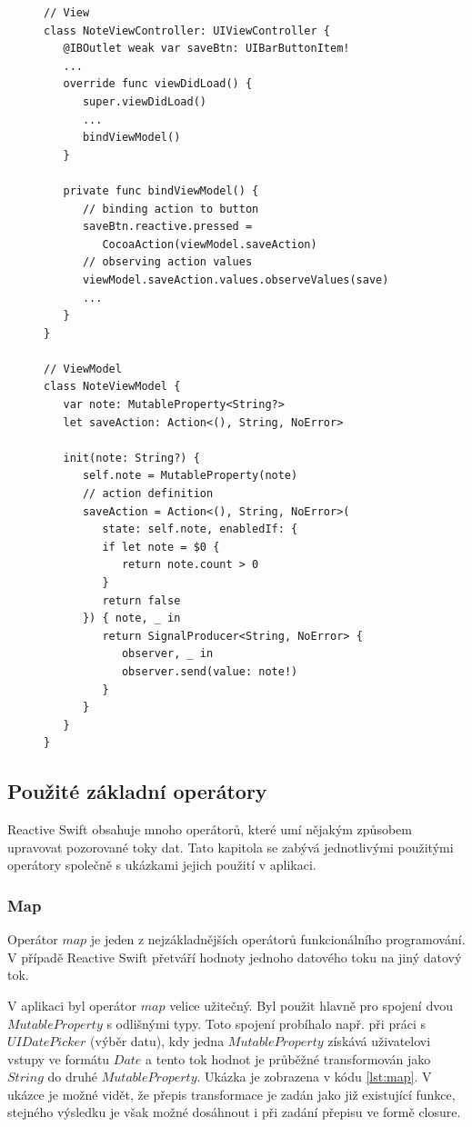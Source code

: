 \documentclass[thesis=M,czech]{FITthesis}[2012/06/26]
\begin{document}
\begin{figure}
\begin{minipage}{\linewidth}
\begin{lstlisting}[caption={Ukázka použití Action},label={lst:action}]
// View
class NoteViewController: UIViewController {
   @IBOutlet weak var saveBtn: UIBarButtonItem!
   ...
   override func viewDidLoad() {
      super.viewDidLoad()
      ...
      bindViewModel()
   }
   
   private func bindViewModel() {
      // binding action to button
      saveBtn.reactive.pressed = 
         CocoaAction(viewModel.saveAction)
      // observing action values
      viewModel.saveAction.values.observeValues(save)
      ...
   }  
} 

// ViewModel
class NoteViewModel {
   var note: MutableProperty<String?>
   let saveAction: Action<(), String, NoError>
   
   init(note: String?) {
      self.note = MutableProperty(note)
      // action definition
      saveAction = Action<(), String, NoError>(
         state: self.note, enabledIf: {
         if let note = $0 {
            return note.count > 0
         }
         return false
      }) { note, _ in
         return SignalProducer<String, NoError> { 
            observer, _ in
            observer.send(value: note!)
         }
      }
   }
}
\end{lstlisting}
\end{minipage}
\end{figure}	

\subsection{Použité základní operátory}
Reactive Swift obsahuje mnoho operátorů, které umí nějakým způsobem upravovat pozorované toky dat. Tato kapitola se zabývá jednotlivými použitými operátory společně s ukázkami jejich použití v aplikaci.

\subsubsection{Map}
Operátor $map$ je jeden z nejzákladnějších operátorů funkcionálního programování. V případě Reactive Swift přetváří hodnoty jednoho datového toku na jiný datový tok. \cite{operators}

V aplikaci byl operátor $map$ velice užitečný. Byl použit hlavně pro spojení dvou $MutableProperty$ s odlišnými typy. Toto spojení probíhalo např. při práci s $UIDatePicker$ (výběr datu), kdy jedna $MutableProperty$ získává uživatelovi vstupy ve formátu $Date$ a tento tok hodnot je průběžné transformován jako $String$ do druhé $MutableProperty$. Ukázka je zobrazena v kódu \ref{lst:map}. V ukázce je možné vidět, že přepis transformace je zadán jako již existující funkce, stejného výsledku je však možné dosáhnout i při zadání přepisu ve formě closure.
\end{document}
